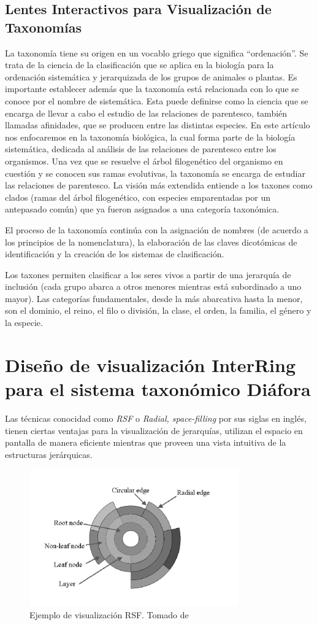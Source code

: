 \documentclass[journal]{IEEEtran}
\begin{document}
 \subsection{Lentes Interactivos para Visualización de Taxonomías}
 La taxonomía tiene su origen en un vocablo griego que significa “ordenación”. Se trata de la ciencia de la clasificación que se aplica en la biología para la ordenación sistemática y jerarquizada de los grupos de animales o plantas.
 Es importante establecer además que la taxonomía está relacionada con lo que se conoce por el nombre de sistemática. Esta puede definirse como la ciencia que se encarga de llevar a cabo el estudio de las relaciones de parentesco, también llamadas afinidades, 
 que se producen entre las distintas especies.
 En este artículo nos enfocaremos en la taxonomía biológica, la cual forma parte de la biología sistemática, dedicada al análisis de las relaciones de parentesco entre los organismos. Una vez que se resuelve el árbol filogenético del organismo en cuestión y se conocen sus ramas evolutivas, 
 la taxonomía se encarga de estudiar las relaciones de parentesco.
 La visión más extendida entiende a los taxones como clados (ramas del árbol filogenético, con especies emparentadas por un antepasado común) que ya fueron asignados a una categoría taxonómica.

El proceso de la taxonomía continúa con la asignación de nombres (de acuerdo a los principios de la nomenclatura), la elaboración de las claves dicotómicas de identificación y la creación de los sistemas de clasificación.

Los taxones permiten clasificar a los seres vivos a partir de una jerarquía de inclusión (cada grupo abarca a otros menores mientras está subordinado a uno mayor). Las categorías fundamentales, desde la más abarcativa hasta la menor, son el 
dominio, el reino, el filo o división, la clase, el orden, la familia, el género y la especie.


\section{Diseño de visualización InterRing para el sistema taxonómico Diáfora}
Las técnicas conocidad como \emph{RSF} o \emph{Radial, space-filling} por sus siglas en inglés,
 tienen ciertas ventajas
para la visualización de jerarquías, utilizan el espacio en pantalla de manera eficiente mientras que proveen una vista intuitiva 
de la estructuras jerárquicas.
\begin{figure}[]
  \centering
  \includegraphics[scale=0.6]{interring}
  \caption{Ejemplo de visualización RSF. Tomado  de \cite{yang_ward_rundensteiner}}
\end{figure}
\end{document}
